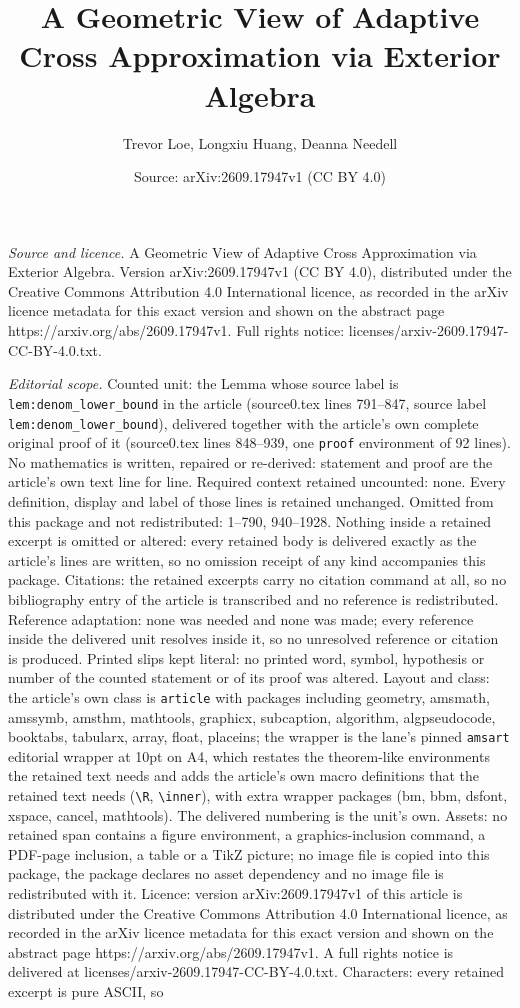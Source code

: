 \documentclass[10pt,a4paper]{amsart}
\title[A Geometric View of Adaptive Cross Approximation via Exterio]{A Geometric View of Adaptive Cross Approximation via Exterior Algebra}
\author{Trevor Loe, Longxiu Huang, Deanna Needell}
\date{Source: arXiv:2609.17947v1 (CC BY 4.0)}
\begin{document}
\maketitle

\noindent\emph{Source and licence.} A Geometric View of Adaptive Cross Approximation via Exterior Algebra. Version arXiv:2609.17947v1 (CC BY 4.0), distributed under the Creative Commons Attribution 4.0 International licence, as recorded in the arXiv licence metadata for this exact version and shown on the abstract page https://arxiv.org/abs/2609.17947v1. Full rights notice: licenses/arxiv-2609.17947-CC-BY-4.0.txt.\par\smallskip

\noindent\textit{Editorial scope.} Counted unit: the Lemma whose source label is \texttt{lem:denom\_lower\_bound} in the article (source0.tex lines 791--847, source label \texttt{lem:denom\_lower\_bound}), delivered together with the article's own complete original proof of it (source0.tex lines 848--939, one \texttt{proof} environment of 92 lines). No mathematics is written, repaired or re-derived: statement and proof are the article's own text line for line. Required context retained uncounted: none. Every definition, display and label of those lines is retained unchanged. Omitted from this package and not redistributed: 1--790, 940--1928. Nothing inside a retained excerpt is omitted or altered: every retained body is delivered exactly as the article's lines are written, so no omission receipt of any kind accompanies this package. Citations: the retained excerpts carry no citation command at all, so no bibliography entry of the article is transcribed and no reference is redistributed. Reference adaptation: none was needed and none was made; every reference inside the delivered unit resolves inside it, so no unresolved reference or citation is produced. Printed slips kept literal: no printed word, symbol, hypothesis or number of the counted statement or of its proof was altered. Layout and class: the article's own class is \texttt{article} with packages including geometry, amsmath, amssymb, amsthm, mathtools, graphicx, subcaption, algorithm, algpseudocode, booktabs, tabularx, array, float, placeins; the wrapper is the lane's pinned \texttt{amsart} editorial wrapper at 10pt on A4, which restates the theorem-like environments the retained text needs and adds the article's own macro definitions that the retained text needs (\texttt{\textbackslash R}, \texttt{\textbackslash inner}), with extra wrapper packages (bm, bbm, dsfont, xspace, cancel, mathtools). The delivered numbering is the unit's own. Assets: no retained span contains a figure environment, a graphics-inclusion command, a PDF-page inclusion, a table or a TikZ picture; no image file is copied into this package, the package declares no asset dependency and no image file is redistributed with it. Licence: version arXiv:2609.17947v1 of this article is distributed under the Creative Commons Attribution 4.0 International licence, as recorded in the arXiv licence metadata for this exact version and shown on the abstract page https://arxiv.org/abs/2609.17947v1. A full rights notice is delivered at licenses/arxiv-2609.17947-CC-BY-4.0.txt. Characters: every retained excerpt is pure ASCII, so 
\end{document}
